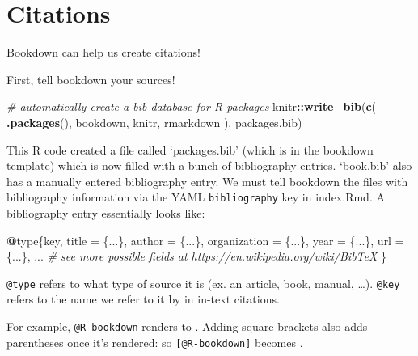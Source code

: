 \documentclass[
]{book}
\newenvironment{Shaded}{\begin{snugshade}}{\end{snugshade}}
\newcommand{\CommentTok}[1]{\textcolor[rgb]{0.56,0.35,0.01}{\textit{#1}}}
\newcommand{\FunctionTok}[1]{\textcolor[rgb]{0.13,0.29,0.53}{\textbf{#1}}}
\newcommand{\NormalTok}[1]{#1}
\newcommand{\OtherTok}[1]{\textcolor[rgb]{0.56,0.35,0.01}{#1}}
\newcommand{\SpecialCharTok}[1]{\textcolor[rgb]{0.81,0.36,0.00}{\textbf{#1}}}
\newcommand{\StringTok}[1]{\textcolor[rgb]{0.31,0.60,0.02}{#1}}
\theoremstyle{definition}
\theoremstyle{definition}
\theoremstyle{definition}
\theoremstyle{definition}
\theoremstyle{remark}
\begin{document}
\section{Citations}\label{citations}

Bookdown can help us create citations!

First, tell bookdown your sources!

\begin{Shaded}
\begin{Highlighting}[]
\CommentTok{\# automatically create a bib database for R packages}
\NormalTok{knitr}\SpecialCharTok{::}\FunctionTok{write\_bib}\NormalTok{(}\FunctionTok{c}\NormalTok{(}
  \FunctionTok{.packages}\NormalTok{(), }\StringTok{\textquotesingle{}bookdown\textquotesingle{}}\NormalTok{, }\StringTok{\textquotesingle{}knitr\textquotesingle{}}\NormalTok{, }\StringTok{\textquotesingle{}rmarkdown\textquotesingle{}}
\NormalTok{), }\StringTok{\textquotesingle{}packages.bib\textquotesingle{}}\NormalTok{)}
\end{Highlighting}
\end{Shaded}

This R code created a file called `packages.bib' (which is in the bookdown template) which is now filled with a bunch of bibliography entries. `book.bib' also has a manually entered bibliography entry. We must tell bookdown the files with bibliography information via the YAML \texttt{bibliography} key in index.Rmd. A bibliography entry essentially looks like:

\begin{Shaded}
\begin{Highlighting}[]
\SpecialCharTok{@}\NormalTok{type\{key,}
\NormalTok{  title }\OtherTok{=}\NormalTok{ \{...\},}
\NormalTok{  author }\OtherTok{=}\NormalTok{ \{...\},}
\NormalTok{  organization }\OtherTok{=}\NormalTok{ \{...\},}
\NormalTok{  year }\OtherTok{=}\NormalTok{ \{...\},}
\NormalTok{  url }\OtherTok{=}\NormalTok{ \{...\},}
\NormalTok{  ... }\CommentTok{\# see more possible fields at https://en.wikipedia.org/wiki/BibTeX}
\NormalTok{\}}
\end{Highlighting}
\end{Shaded}

\texttt{@type} refers to what type of source it is (ex. an article, book, manual, \ldots). \texttt{@key} refers to the name we refer to it by in in-text citations.

For example, \texttt{@R-bookdown} renders to \citet{R-bookdown}. Adding square brackets also adds parentheses once it's rendered: so \texttt{{[}@R-bookdown{]}} becomes \citep{R-bookdown}.
\end{document}
